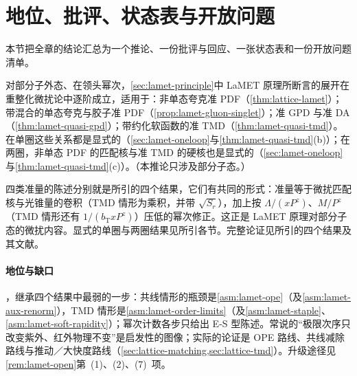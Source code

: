 \section{地位、批评、状态表与开放问题}\label{sec:lattice-status}

本节把全章的结论汇总为一个推论、一份批评与回应、一张状态表和一份开放问题清单。

\begin{corollary}\label{cor:lamet-principle-pt}
对部分子外态、在领头幂次，\cref{sec:lamet-principle}中 LaMET 原理所断言的展开在重整化微扰论中逐阶成立，适用于：非单态夸克准 PDF（\cref{thm:lattice-lamet}）；带混合的单态夸克与胶子准 PDF（\cref{prop:lamet-gluon-singlet}）；准 GPD 与准 DA（\cref{thm:lamet-quasi-gpd}）；带约化软函数的准 TMD（\cref{thm:lamet-quasi-tmd}）。在单圈这些关系都是显式的（\cref{sec:lamet-oneloop}与\cref{thm:lamet-quasi-tmd}(b)）；在两圈，非单态 PDF 的匹配核与准 TMD 的硬核也是显式的（\cref{sec:lamet-oneloop}与\cref{thm:lamet-quasi-tmd}(c)）。（本推论只涉及部分子态。）
\end{corollary}

\begin{proofsketch}
四类准量的陈述分别就是所引的四个结果，它们有共同的形式：准量等于微扰匹配核与光锥量的卷积（TMD 情形为乘积，并带 $\sqrt{S_r}$），加上按 $\Lambda/(xP^z)$、$M/P^z$（TMD 情形还有 $1/(b_{\mathrm T}xP^z)$）压低的幂次修正。这正是 LaMET 原理对部分子态的微扰内容。显式的单圈与两圈结果见所引各节。完整论证见所引的四个结果及其文献。
\end{proofsketch}

\paragraph{地位与缺口}
\tagA，继承四个结果中最弱的一步：共线情形的瓶颈是\cref{asm:lamet-ope}（及\cref{asm:lamet-aux-renorm}），TMD 情形是\cref{asm:lamet-order-limits}（及\cref{asm:lamet-staple}、\cref{asm:lamet-soft-rapidity}）；幂次计数各步只给出 E-S 型陈述。常说的“极限次序只改变紫外、红外物理不变”是启发性的图像；实际的论证是 OPE 路线、共线减除路线与推动／大快度路线（\cref{sec:lattice-matching,sec:lattice-tmd}）。升级途径见\cref{rem:lamet-open}第~(1)、(2)、(7)~项。

